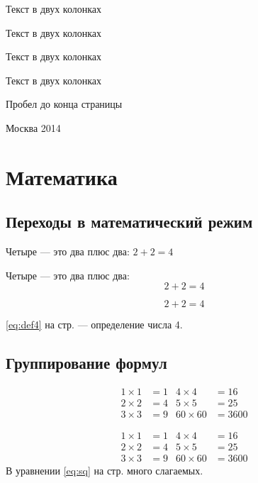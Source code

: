 \begin{multicols}{2}
    Текст в двух колонках

    Текст в двух колонках

    Текст в двух колонках

    Текст в двух колонках
\end{multicols}

Пробел до конца страницы
\vfill
\begin{center}
    Москва 2014
\end{center}
\newpage

\section{Математика}
\subsection{Переходы в математический режим}

Четыре --- это два плюс два: $2+2=4$

Четыре --- это два плюс два: \[2+2=4\]

\begin{equation}\label{eq:def4}
    2+2=4
\end{equation}

\eqref{eq:def4}  на стр. \pageref{eq:def4} --- определение числа 4.

\subsection{Группирование формул}

\begin{align}
    1\times 1 & = 1 & 4\times 4   & = 16 \tag{TAG} \label{eq:sq} \\
    2\times 2 & = 4 & 5\times 5   & = 25                         \\
    3\times 3 & = 9 & 60\times 60 & = 3600
\end{align}

\begin{equation}
    \begin{aligned}
        1\times 1 & = 1 & 4\times 4   & = 16   \\
        2\times 2 & = 4 & 5\times 5   & = 25   \\
        3\times 3 & = 9 & 60\times 60 & = 3600
    \end{aligned}
\end{equation}
В уравнении \eqref{eq:sq} на стр. \pageref{eq:sq} много слагаемых.


